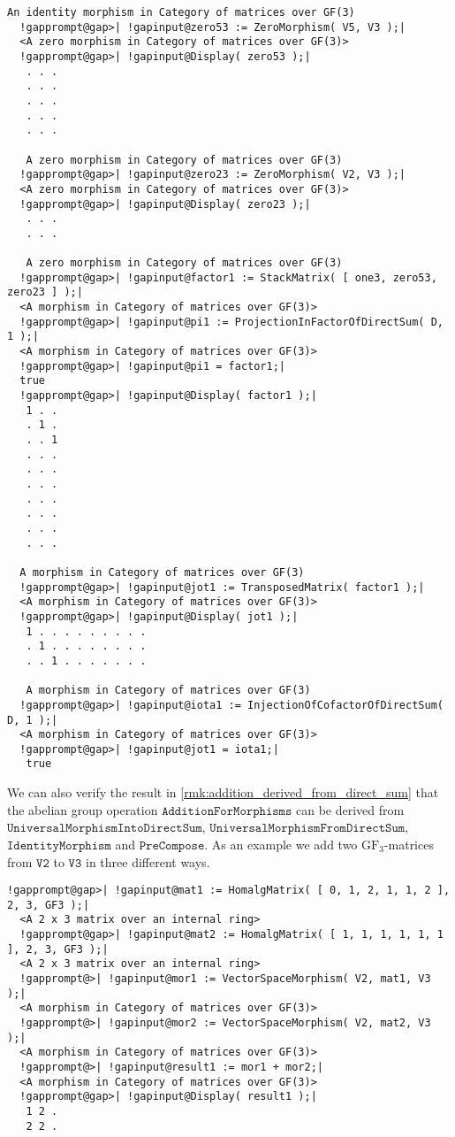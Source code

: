 \begin{computation}
\begin{Verbatim}[commandchars=!@|,fontsize=\small,frame=single,label=Example]
   An identity morphism in Category of matrices over GF(3)
  !gapprompt@gap>| !gapinput@zero53 := ZeroMorphism( V5, V3 );|
  <A zero morphism in Category of matrices over GF(3)>
  !gapprompt@gap>| !gapinput@Display( zero53 );|
   . . .
   . . .
   . . .
   . . .
   . . .
   
   A zero morphism in Category of matrices over GF(3)
  !gapprompt@gap>| !gapinput@zero23 := ZeroMorphism( V2, V3 );|
  <A zero morphism in Category of matrices over GF(3)>
  !gapprompt@gap>| !gapinput@Display( zero23 );|
   . . .
   . . .
   
   A zero morphism in Category of matrices over GF(3)
  !gapprompt@gap>| !gapinput@factor1 := StackMatrix( [ one3, zero53, zero23 ] );|
  <A morphism in Category of matrices over GF(3)>
  !gapprompt@gap>| !gapinput@pi1 := ProjectionInFactorOfDirectSum( D, 1 );|
  <A morphism in Category of matrices over GF(3)>
  !gapprompt@gap>| !gapinput@pi1 = factor1;|
  true
  !gapprompt@gap>| !gapinput@Display( factor1 );|
   1 . .
   . 1 .
   . . 1
   . . .
   . . .
   . . .
   . . .
   . . .
   . . .
   . . .
  
  A morphism in Category of matrices over GF(3)
  !gapprompt@gap>| !gapinput@jot1 := TransposedMatrix( factor1 );|
  <A morphism in Category of matrices over GF(3)>
  !gapprompt@gap>| !gapinput@Display( jot1 );|
   1 . . . . . . . . .
   . 1 . . . . . . . .
   . . 1 . . . . . . .
   
   A morphism in Category of matrices over GF(3)
  !gapprompt@gap>| !gapinput@iota1 := InjectionOfCofactorOfDirectSum( D, 1 );|
  <A morphism in Category of matrices over GF(3)>
  !gapprompt@gap>| !gapinput@jot1 = iota1;|
   true
\end{Verbatim}

We can also verify the result in \ref{rmk:addition_derived_from_direct_sum} that the abelian group operation
$\mathtt{AdditionForMorphisms}$ can be derived from $\mathtt{UniversalMorphismIntoDirectSum}$,
$\mathtt{UniversalMorphismFromDirectSum}$,\\
$\mathtt{IdentityMorphism}$ and
$\mathtt{PreCompose}$. As an example we add two $\mathrm{GF}_{3}$-matrices from $\mathtt{V2}$ to $\mathtt{V3}$ in three
different ways.

\begin{Verbatim}[commandchars=!@|,fontsize=\small,frame=single,label=Example]
  !gapprompt@gap>| !gapinput@mat1 := HomalgMatrix( [ 0, 1, 2, 1, 1, 2 ], 2, 3, GF3 );|
  <A 2 x 3 matrix over an internal ring>
  !gapprompt@gap>| !gapinput@mat2 := HomalgMatrix( [ 1, 1, 1, 1, 1, 1 ], 2, 3, GF3 );|
  <A 2 x 3 matrix over an internal ring>
  !gapprompt@>| !gapinput@mor1 := VectorSpaceMorphism( V2, mat1, V3 );|
  <A morphism in Category of matrices over GF(3)>
  !gapprompt@>| !gapinput@mor2 := VectorSpaceMorphism( V2, mat2, V3 );|
  <A morphism in Category of matrices over GF(3)>
  !gapprompt@>| !gapinput@result1 := mor1 + mor2;|
  <A morphism in Category of matrices over GF(3)>
  !gapprompt@gap>| !gapinput@Display( result1 );|
   1 2 .
   2 2 .
   

\end{Verbatim}
\end{computation}
